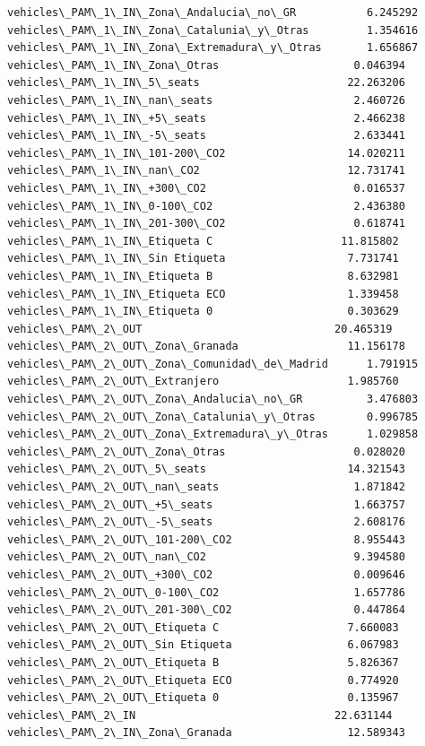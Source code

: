 \documentclass[11pt]{article}
\begin{document}
\begin{Verbatim}[commandchars=\\\{\}]
vehicles\_PAM\_1\_IN\_Zona\_Andalucia\_no\_GR           6.245292
vehicles\_PAM\_1\_IN\_Zona\_Catalunia\_y\_Otras         1.354616
vehicles\_PAM\_1\_IN\_Zona\_Extremadura\_y\_Otras       1.656867
vehicles\_PAM\_1\_IN\_Zona\_Otras                     0.046394
vehicles\_PAM\_1\_IN\_5\_seats                       22.263206
vehicles\_PAM\_1\_IN\_nan\_seats                      2.460726
vehicles\_PAM\_1\_IN\_+5\_seats                       2.466238
vehicles\_PAM\_1\_IN\_-5\_seats                       2.633441
vehicles\_PAM\_1\_IN\_101-200\_CO2                   14.020211
vehicles\_PAM\_1\_IN\_nan\_CO2                       12.731741
vehicles\_PAM\_1\_IN\_+300\_CO2                       0.016537
vehicles\_PAM\_1\_IN\_0-100\_CO2                      2.436380
vehicles\_PAM\_1\_IN\_201-300\_CO2                    0.618741
vehicles\_PAM\_1\_IN\_Etiqueta C                    11.815802
vehicles\_PAM\_1\_IN\_Sin Etiqueta                   7.731741
vehicles\_PAM\_1\_IN\_Etiqueta B                     8.632981
vehicles\_PAM\_1\_IN\_Etiqueta ECO                   1.339458
vehicles\_PAM\_1\_IN\_Etiqueta 0                     0.303629
vehicles\_PAM\_2\_OUT                              20.465319
vehicles\_PAM\_2\_OUT\_Zona\_Granada                 11.156178
vehicles\_PAM\_2\_OUT\_Zona\_Comunidad\_de\_Madrid      1.791915
vehicles\_PAM\_2\_OUT\_Extranjero                    1.985760
vehicles\_PAM\_2\_OUT\_Zona\_Andalucia\_no\_GR          3.476803
vehicles\_PAM\_2\_OUT\_Zona\_Catalunia\_y\_Otras        0.996785
vehicles\_PAM\_2\_OUT\_Zona\_Extremadura\_y\_Otras      1.029858
vehicles\_PAM\_2\_OUT\_Zona\_Otras                    0.028020
vehicles\_PAM\_2\_OUT\_5\_seats                      14.321543
vehicles\_PAM\_2\_OUT\_nan\_seats                     1.871842
vehicles\_PAM\_2\_OUT\_+5\_seats                      1.663757
vehicles\_PAM\_2\_OUT\_-5\_seats                      2.608176
vehicles\_PAM\_2\_OUT\_101-200\_CO2                   8.955443
vehicles\_PAM\_2\_OUT\_nan\_CO2                       9.394580
vehicles\_PAM\_2\_OUT\_+300\_CO2                      0.009646
vehicles\_PAM\_2\_OUT\_0-100\_CO2                     1.657786
vehicles\_PAM\_2\_OUT\_201-300\_CO2                   0.447864
vehicles\_PAM\_2\_OUT\_Etiqueta C                    7.660083
vehicles\_PAM\_2\_OUT\_Sin Etiqueta                  6.067983
vehicles\_PAM\_2\_OUT\_Etiqueta B                    5.826367
vehicles\_PAM\_2\_OUT\_Etiqueta ECO                  0.774920
vehicles\_PAM\_2\_OUT\_Etiqueta 0                    0.135967
vehicles\_PAM\_2\_IN                               22.631144
vehicles\_PAM\_2\_IN\_Zona\_Granada                  12.589343

\end{Verbatim}
\end{document}
